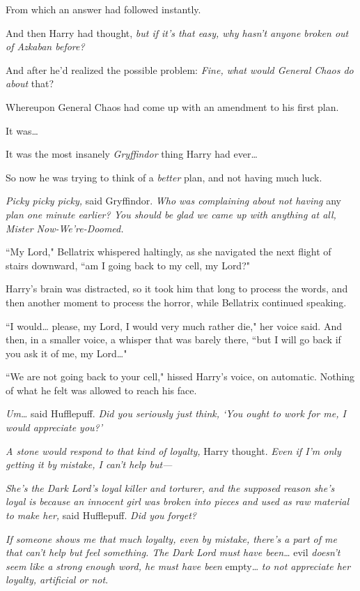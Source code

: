 From which an answer had followed instantly.

And then Harry had thought, \emph{but if it's \emph{that} easy, why hasn't anyone broken out of Azkaban before?}

And after he'd realized the possible problem: \emph{Fine, what would General Chaos do about} that?

Whereupon General Chaos had come up with an amendment to his first plan.

It was{\ldots}

It was the most insanely \emph{Gryffindor} thing Harry had ever{\ldots}

So now he was trying to think of a \emph{better} plan, and not having much luck.

\emph{Picky picky picky,} said Gryffindor. \emph{Who was complaining about not having} any \emph{plan one minute earlier? You should be glad we came up with anything at all, Mister Now-We're-Doomed.}

``My Lord," Bellatrix whispered haltingly, as she navigated the next flight of stairs downward, ``am I going back to my cell, my Lord?"

Harry's brain was distracted, so it took him that long to process the words, and then another moment to process the horror, while Bellatrix continued speaking.

``I would{\ldots} please, my Lord, I would very much rather die," her voice said. And then, in a smaller voice, a whisper that was barely there, ``but I will go back if you ask it of me, my Lord{\ldots}"

``We are not going back to your cell," hissed Harry's voice, on automatic. Nothing of what he felt was allowed to reach his face.

\emph{Um{\ldots}} said Hufflepuff. \emph{Did you seriously just think, `You ought to work for me, \emph{I} would appreciate you?'}

\emph{A stone would respond to that kind of loyalty,} Harry thought. \emph{Even if I'm only getting it by mistake, I can't help but—}

\emph{She's the Dark Lord's loyal killer and torturer, and the supposed reason she's loyal is because an innocent girl was broken into pieces and used as raw material to make her,} said Hufflepuff. \emph{Did you forget?}

\emph{If someone shows me that much loyalty, even by mistake, there's a part of me that can't help but feel something. The Dark Lord must have been{\ldots}} evil \emph{doesn't seem like a strong enough word, he must have been} empty{\ldots} \emph{to not appreciate her loyalty, artificial or not}.

